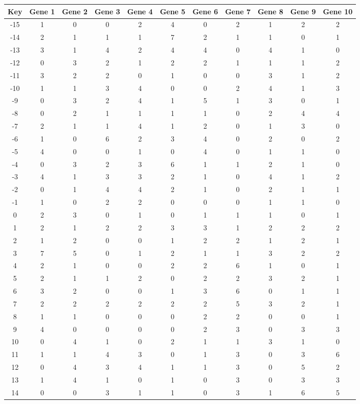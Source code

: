 \begin{tabular}{|c|c|c|c|c|c|c|c|c|c|c|}
\hline
Key & Gene 1 & Gene 2 & Gene 3 & Gene 4 & Gene 5 & Gene 6 & Gene 7 & Gene 8 & Gene 9 & Gene 10 \\
\hline
-15 & 1 & 0 & 0 & 2 & 4 & 0 & 2 & 1 & 2 & 2 \\
-14 & 2 & 1 & 1 & 1 & 7 & 2 & 1 & 1 & 0 & 1 \\
-13 & 3 & 1 & 4 & 2 & 4 & 4 & 0 & 4 & 1 & 0 \\
-12 & 0 & 3 & 2 & 1 & 2 & 2 & 1 & 1 & 1 & 2 \\
-11 & 3 & 2 & 2 & 0 & 1 & 0 & 0 & 3 & 1 & 2 \\
-10 & 1 & 1 & 3 & 4 & 0 & 0 & 2 & 4 & 1 & 3 \\
-9 & 0 & 3 & 2 & 4 & 1 & 5 & 1 & 3 & 0 & 1 \\
-8 & 0 & 2 & 1 & 1 & 1 & 1 & 0 & 2 & 4 & 4 \\
-7 & 2 & 1 & 1 & 4 & 1 & 2 & 0 & 1 & 3 & 0 \\
-6 & 1 & 0 & 6 & 2 & 3 & 4 & 0 & 2 & 0 & 2 \\
-5 & 4 & 0 & 0 & 1 & 0 & 4 & 0 & 1 & 1 & 0 \\
-4 & 0 & 3 & 2 & 3 & 6 & 1 & 1 & 2 & 1 & 0 \\
-3 & 4 & 1 & 3 & 3 & 2 & 1 & 0 & 4 & 1 & 2 \\
-2 & 0 & 1 & 4 & 4 & 2 & 1 & 0 & 2 & 1 & 1 \\
-1 & 1 & 0 & 2 & 2 & 0 & 0 & 0 & 1 & 1 & 0 \\
0 & 2 & 3 & 0 & 1 & 0 & 1 & 1 & 1 & 0 & 1 \\
1 & 2 & 1 & 2 & 2 & 3 & 3 & 1 & 2 & 2 & 2 \\
2 & 1 & 2 & 0 & 0 & 1 & 2 & 2 & 1 & 2 & 1 \\
3 & 7 & 5 & 0 & 1 & 2 & 1 & 1 & 3 & 2 & 2 \\
4 & 2 & 1 & 0 & 0 & 2 & 2 & 6 & 1 & 0 & 1 \\
5 & 2 & 1 & 1 & 2 & 0 & 2 & 2 & 3 & 2 & 1 \\
6 & 3 & 2 & 0 & 0 & 1 & 3 & 6 & 0 & 1 & 1 \\
7 & 2 & 2 & 2 & 2 & 2 & 2 & 5 & 3 & 2 & 1 \\
8 & 1 & 1 & 0 & 0 & 0 & 2 & 2 & 0 & 0 & 1 \\
9 & 4 & 0 & 0 & 0 & 0 & 2 & 3 & 0 & 3 & 3 \\
10 & 0 & 4 & 1 & 0 & 2 & 1 & 1 & 3 & 1 & 0 \\
11 & 1 & 1 & 4 & 3 & 0 & 1 & 3 & 0 & 3 & 6 \\
12 & 0 & 4 & 3 & 4 & 1 & 1 & 3 & 0 & 5 & 2 \\
13 & 1 & 4 & 1 & 0 & 1 & 0 & 3 & 0 & 3 & 3 \\
14 & 0 & 0 & 3 & 1 & 1 & 0 & 3 & 1 & 6 & 5 \\
\hline
\end{tabular}